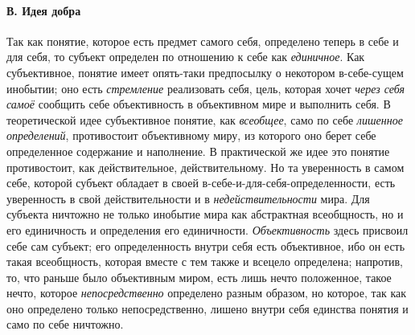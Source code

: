\documentclass[twoside]{article}
\begin{document}
\paragraph[В. Идея добра]{В. Идея добра}
Так как понятие, которое есть предмет самого себя, определено
теперь в себе и для себя, то субъект определен по отношению к себе как
{\em единичное}. Как
субъективное, понятие имеет опять-таки предпосылку о некотором в-себе-сущем
инобытии; оно есть {\em стремление}
реализовать себя, цель, которая хочет
{\em через себя самоё}
сообщить себе объективность в объективном мире и выполнить
себя. В теоретической идее субъективное понятие, как
{\em всеобщее}, само по
себе {\em лишенное определений},
противостоит объективному миру, из которого оно берет себе
определенное содержание и наполнение. В практической же идее это понятие
противостоит, как действительное, действительному. Но та уверенность в
самом себе, которой субъект обладает в своей
в-себе-и-для-себя-определенности, есть уверенность в свой действительности
и в {\em недействительности}
мира. Для субъекта ничтожно не только инобытие мира как
абстрактная всеобщность, но и его единичность и определения его
единичности. {\em Объективность}
здесь присвоил себе сам субъект; его определенность внутри
себя есть объективное, ибо он есть такая всеобщность, которая вместе с тем
также и всецело определена; напротив, то, что раньше было объективным
миром, есть лишь нечто положенное, такое нечто, которое
{\em непосредственно}
определено разным образом, но которое, так как оно определено
только непосредственно, лишено внутри себя единства понятия и само по себе
ничтожно.
\end{document}
